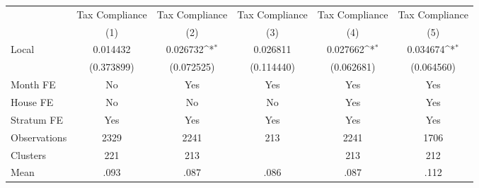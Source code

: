 {
\def\sym#1{\ifmmode^{#1}\else\(^{#1}\)\fi}
\begin{tabular}{l*{5}{c}}
\toprule
                &\multicolumn{1}{c}{Tax Compliance}&\multicolumn{1}{c}{Tax Compliance}&\multicolumn{1}{c}{Tax Compliance}&\multicolumn{1}{c}{Tax Compliance}&\multicolumn{1}{c}{Tax Compliance}\\
                &\multicolumn{1}{c}{(1)}         &\multicolumn{1}{c}{(2)}         &\multicolumn{1}{c}{(3)}         &\multicolumn{1}{c}{(4)}         &\multicolumn{1}{c}{(5)}         \\
\midrule
Local           & 0.014432         & 0.026732\sym{*}  & 0.026811         & 0.027662\sym{*}  & 0.034674\sym{*}  \\
                &(0.373899)         &(0.072525)         &(0.114440)         &(0.062681)         &(0.064560)         \\
Month FE        &       No         &      Yes         &      Yes         &      Yes         &      Yes         \\
House FE        &       No         &       No         &       No         &      Yes         &      Yes         \\
Stratum FE      &      Yes         &      Yes         &      Yes         &      Yes         &      Yes         \\
\midrule
Observations    &     2329         &     2241         &      213         &     2241         &     1706         \\
Clusters        &      221         &      213         &                  &      213         &      212         \\
Mean            &     .093         &     .087         &     .086         &     .087         &     .112         \\
\bottomrule
\end{tabular}
}
